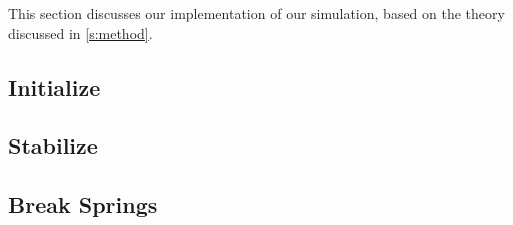 This section discusses our implementation of our simulation, based on the theory discussed in \cref{s:method}. 

\subsection{Initialize}

\subsection{Stabilize}

\subsection{Break Springs}




